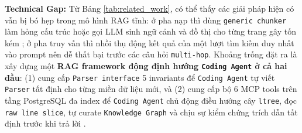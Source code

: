 \noindent\textbf{Technical Gap:} Từ Bảng \ref{tab:related_work}, có thể thấy các giải pháp hiện có vẫn bị bó hẹp trong mô hình RAG tĩnh: ở pha nạp thì dùng \texttt{generic chunker} làm hỏng cấu trúc hoặc gọi LLM sinh ngữ cảnh và đồ thị cho từng trang gây tốn kém \cite{anthropic2024contextual, edge2024graphrag}; ở pha truy vấn thì nhồi thụ động kết quả của một lượt tìm kiếm duy nhất vào prompt nên dễ thất bại trước các câu hỏi \texttt{multi-hop}. Khoảng trống đặt ra là xây dựng một \textbf{RAG framework động định hướng \texttt{Coding Agent} ở cả hai đầu}: (1) cung cấp \texttt{Parser interface} 5 invariants để \texttt{Coding Agent} tự viết \texttt{Parser} tất định cho từng miền dữ liệu mới, và (2) cung cấp bộ 6 MCP tools trên tầng PostgreSQL đa index để \texttt{Coding Agent} chủ động điều hướng cây \texttt{ltree}, đọc \texttt{raw line slice}, tự curate \texttt{Knowledge Graph} và chịu sự kiểm chứng trích dẫn tất định trước khi trả lời \cite{anthropic2024mcp}.

